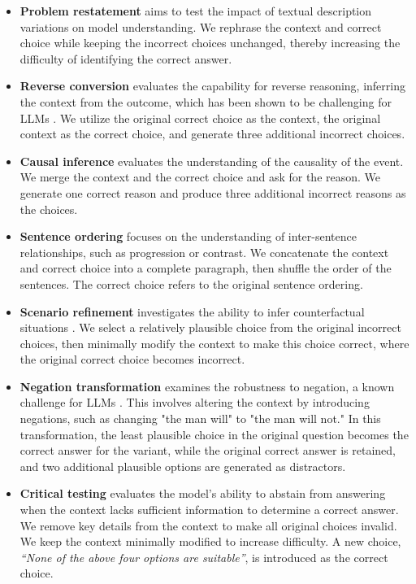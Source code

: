 \begin{itemize}[leftmargin=*]
    \setlength{\itemsep}{0pt}
    \item \textbf{Problem restatement} aims to test the impact of textual description variations on model understanding. We rephrase the context and correct choice while keeping the incorrect choices unchanged, thereby increasing the difficulty of identifying the correct answer. 

    \item \textbf{Reverse conversion} evaluates the capability for reverse reasoning, \ie inferring the context from the outcome, which has been shown to be challenging for LLMs \cite{guo2024exploring}. We utilize the original correct choice as the context, the original context as the correct choice, and generate three additional incorrect choices. 

    \item \textbf{Causal inference} evaluates the understanding of the causality of the event.  We merge the context and the correct choice and ask for the reason. We generate one correct reason and produce three additional incorrect reasons as the choices.

    \item \textbf{Sentence ordering} focuses on the understanding of inter-sentence relationships, such as progression or contrast.     
    We concatenate the context and correct choice into a complete paragraph, then shuffle the order of the sentences. The correct choice refers to the original sentence ordering. 

    \item \textbf{Scenario refinement} investigates the ability to infer counterfactual situations \cite{ma2024kor}. We select a relatively plausible choice from the original incorrect choices, then minimally modify the context to make this choice correct, where the original correct choice becomes incorrect. 

    \item \textbf{Negation transformation} examines the robustness to negation, a known challenge for LLMs \cite{balepur2024s}. This involves altering the context by introducing negations, such as changing "the man will" to "the man will not." In this transformation, the least plausible choice in the original question becomes the correct answer for the variant, while the original correct answer is retained, and two additional plausible options are generated as distractors. 
    
    \item \textbf{Critical testing} evaluates the model's ability to abstain from answering when the context lacks sufficient information to determine a correct answer. We remove key details from the context to make all original choices invalid. 
    We keep the context minimally modified to increase difficulty. 
    A new choice, \emph{``None of the above four options are suitable''},  is introduced as the correct choice. 
\end{itemize}

